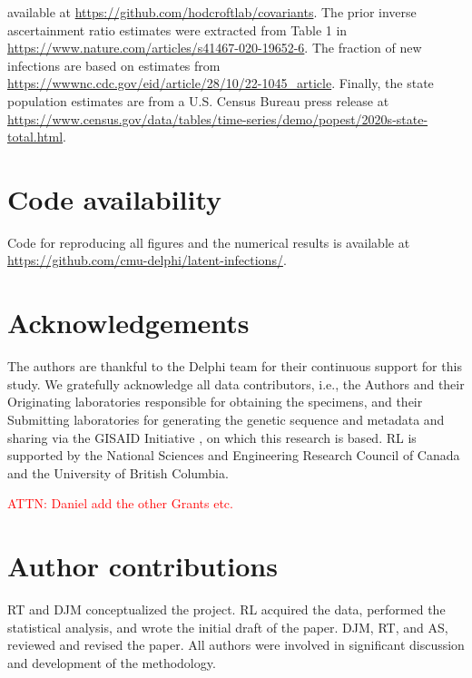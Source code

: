 \documentclass{article}
\newcommand{\attn }[1]{\textcolor{red}{ATTN: #1}}
\begin{document}
available at \newline \href{https://github.com/hodcroftlab/covariants}{https://github.com/hodcroftlab/covariants}. 
The prior inverse ascertainment ratio estimates were extracted from Table 1 in
 \href{https://www.nature.com/articles/s41467-020-19652-6}{https://www.nature.com/articles/s41467-020-19652-6}. 
 The fraction of new infections are based on estimates from \href{https://wwwnc.cdc.gov/eid/article/28/10/22-1045\_article}{https://wwwnc.cdc.gov/eid/article/28/10/22-1045\_article}. 
Finally, the state population estimates are from a U.S. Census Bureau press release at \href{https://www.census.gov/data/tables/time-series/demo/popest/2020s-state-total.html}{https://www.census.gov/data/tables/time-series/demo/popest/2020s-state-total.html}.




\section*{Code availability}
Code for reproducing all figures and the numerical results is 
available at 
\href{https://github.com/cmu-delphi/latent-infections/}{https://github.com/cmu-delphi/latent-infections/}.

\clearpage
%




\section*{Acknowledgements}

The authors are thankful to the Delphi team for their continuous support for
this study. We gratefully acknowledge all data contributors, i.e., the Authors
and their Originating laboratories responsible for obtaining the specimens, and
their Submitting laboratories for generating the genetic sequence and metadata
and sharing via the GISAID Initiative \citep{elbe2017data}, on which this
research is based. %
RL is supported by the National Sciences and Engineering Research Council of 
Canada and the University of British Columbia.

\attn{Daniel add the other Grants etc.}

\section*{Author contributions}
RT and DJM conceptualized the project. RL acquired the data, performed the
statistical analysis, and wrote the initial draft of the paper. DJM, RT, and AS,
reviewed and revised the paper. All authors were involved in significant
discussion and development of the methodology.
\end{document}
